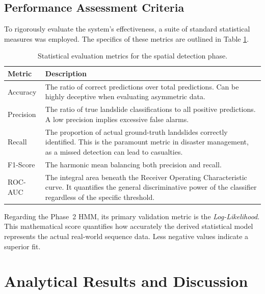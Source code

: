 \documentclass[12pt,a4paper]{report}
\begin{document}
\section{Performance Assessment Criteria}
To rigorously evaluate the system's effectiveness, a suite of standard statistical measures was employed. The specifics of these metrics are outlined in Table \ref{tab:metrics}.

\begin{table}[H]
\begin{center}
\caption{Statistical evaluation metrics for the spatial detection phase.}\label{tab:metrics}
\renewcommand{\arraystretch}{1.3}
\begin{tabular}{lp{9cm}}
\hline
{\bf Metric} & {\bf Description} \\
\hline
Accuracy & The ratio of correct predictions over total predictions. Can be highly deceptive when evaluating asymmetric data. \\
Precision & The ratio of true landslide classifications to all positive predictions. A low precision implies excessive false alarms. \\
Recall & The proportion of actual ground-truth landslides correctly identified. This is the paramount metric in disaster management, as a missed detection can lead to casualties. \\
F1-Score & The harmonic mean balancing both precision and recall. \\
ROC-AUC & The integral area beneath the Receiver Operating Characteristic curve. It quantifies the general discriminative power of the classifier regardless of the specific threshold. \\
\hline
\end{tabular}
\end{center}
\end{table}

Regarding the Phase~2 HMM, its primary validation metric is the \textit{Log-Likelihood}. This mathematical score quantifies how accurately the derived statistical model represents the actual real-world sequence data. Less negative values indicate a superior fit.

\chapter{Analytical Results and Discussion}\label{results}
\end{document}

